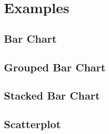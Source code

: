 \chapter{Examples}
\label{chap:Examples}

\section{Bar Chart}

\section{Grouped Bar Chart}

\section{Stacked Bar Chart}

\section{Scatterplot}